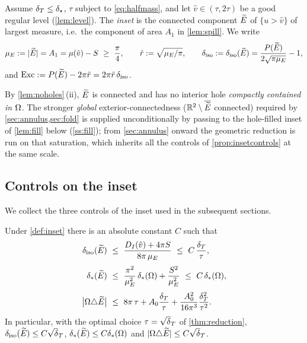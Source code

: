 \begin{definition}\label{def:inset}
Assume $\delta_T\le\delta_\star$, $\tau$ subject to \eqref{eq:halfmass}, and let
$\hat v\in(\tau,2\tau)$ be a good regular level (\cref{lem:level}). The
\emph{inset} is the connected component $\widetilde{E}$ of $\{u>\hat v\}$ of largest
measure, i.e.\ the component of area $A_1$ in \cref{lem:spill}. We write
\[
   \mu_E:=|\widetilde{E}|=A_1=\mu(\hat v)-S\ \ge\ \frac\pi4,
   \qquad
   \hat r:=\sqrt{\mu_E/\pi},
   \qquad
   \delta_{\mathrm{iso}}:=\delta_{\mathrm{iso}}(\widetilde{E})=\frac{P(\widetilde{E})}{2\sqrt{\pi\mu_E}}-1,
\]
and $\mathrm{Exc}:=P(\widetilde{E})-2\pi\hat r=2\pi\hat r\,\delta_{\mathrm{iso}}$.
\end{definition}

By \cref{lem:noholes}\,(ii), $\widetilde{E}$ is connected and has no interior hole
\emph{compactly contained in $\Omega$}. The stronger \emph{global}
exterior-connectedness ($\mathbb{R}^2\setminus\overline{\widetilde{E}}$ connected) required by
\cref{sec:annulus,sec:fold} is supplied unconditionally by passing to the
hole-filled inset of \cref{lem:fill} below (\cref{ss:fill}); from
\cref{sec:annulus} onward the geometric reduction is run on that saturation,
which inherits all the controls of \cref{prop:insetcontrols} at the same scale.

\subsection{Controls on the inset}

We collect the three controls of the inset used in the subsequent sections.

\begin{proposition}\label{prop:insetcontrols}
Under \cref{def:inset} there is an absolute constant $C$ such that
\begin{align}
   \diso(\Etil)\ &\le\ \frac{D_I(\hat v)+4\pi S}{8\pi\,\mu_E}
   \ \le\ C\,\frac{\dT}{\tau},
   \label{eq:diso-inset}\\[1mm]
   \dstar(\Etil)\ &\le\ \frac{\pi^2}{\mu_E^2}\,\dstar(\Om)
   +\frac{S^2}{\mu_E^2}
   \ \le\ C\,\dstar(\Om),
   \label{eq:dstar-inset}\\[1mm]
   \bigl|\Om\triangle\Etil\bigr|\ &\le\ 8\pi\,\tau+A_0\frac{\dT}{\tau}
   +\frac{A_0^2}{16\pi^3}\frac{\dT^2}{\tau^2}.
   \label{eq:close-inset}
\end{align}
In particular, with the optimal choice $\tau=\sqrt\dT$ of
\cref{thm:reduction}, $\diso(\Etil)\le C\sqrt\dT$,
$\delta_{*}(\widetilde{E})\le C\delta_{*}(\Omega)$ and
$|\Om\triangle\Etil|\le C\sqrt\dT$.
\end{proposition}

